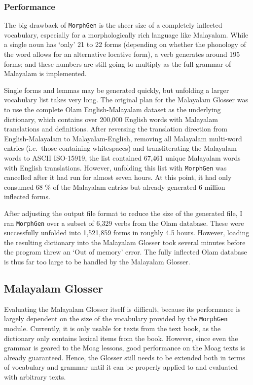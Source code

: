 \documentclass[a4paper]{article}
\newcommand{\typ}[1]{\texttt{#1}}
\begin{document}
\subsubsection{Performance}

The big drawback of \typ{MorphGen} is the sheer size of a completely inflected vocabulary, especially for a morphologically rich language like Malayalam. While a single noun has `only' 21 to 22 forms (depending on whether the phonology of the word allows for an alternative locative form), a verb generates around 195 forms; and these numbers are still going to multiply as the full grammar of Malayalam is implemented.

Single forms and lemmas may be generated quickly, but unfolding a larger vocabulary list takes very long. The original plan for the Malayalam Glosser was to use the complete Olam English-Malayalam dataset \parencite{olam} as the underlying dictionary, which contains over 200,000 English words with Malayalam translations and definitions. After reversing the translation direction from English-Malayalam to Malayalam-English, removing all Malayalam multi-word entries (i.e.\ those containing whitespaces) and transliterating the Malayalam words to ASCII ISO-15919, the list contained 67,461 unique Malayalam words with English translations. However, unfolding this list with \typ{MorphGen} was cancelled after it had run for almost seven hours. At this point, it had only consumed 68 \% of the Malayalam entries but already generated 6 million inflected forms.

After adjusting the output file format to reduce the size of the generated file, I ran \typ{MorphGen} over a subset of 6,329 verbs from the Olam database. These were successfully unfolded into 1,521,859 forms in roughly 4.5 hours. However, loading the resulting dictionary into the Malayalam Glosser took several minutes before the program threw an `Out of memory' error. The fully inflected Olam database is thus far too large to be handled by the Malayalam Glosser.

\subsection{Malayalam Glosser}

Evaluating the Malayalam Glosser itself is difficult, because its performance is largely dependent on the size of the vocabulary provided by the \typ{MorphGen} module. Currently, it is only usable for texts from the \textcite{moag} text book, as the dictionary only contains lexical items from the book. However, since even the grammar is geared to the Moag lessons, good performance on the Moag texts is already guaranteed. Hence, the Glosser still needs to be extended both in terms of vocabulary and grammar until it can be properly applied to and evaluated with arbitrary texts.
\end{document}
